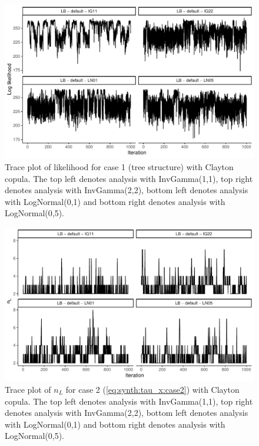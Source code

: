 \documentclass{amsart}
\begin{document}
\begin{figure}
	\centering
	\includegraphics[width = 0.75\linewidth]{trace_case1_clayton_like.pdf}
	\caption{Trace plot of likelihood for case 1 (tree structure) with Clayton copula. The top left denotes analysis with InvGamma(1,1), top right denotes analysis with InvGamma(2,2), bottom left denotes analysis with LogNormal(0,1) and bottom right denotes analysis with LogNormal(0,5).}
	\label{fig:case1:clayton:like}
\end{figure}

\begin{figure}
	\centering
	\includegraphics[width = 0.75\linewidth]{trace_case2_clayton_nterm.pdf}
	\caption{Trace plot of $n_L$ for case 2 (\cref{eq:synth:tau_x:case2}) with Clayton copula. The top left denotes analysis with InvGamma(1,1), top right denotes analysis with InvGamma(2,2), bottom left denotes analysis with LogNormal(0,1) and bottom right denotes analysis with LogNormal(0,5).}
	\label{fig:case2:clayton:nterm}
\end{figure}
\end{document}
